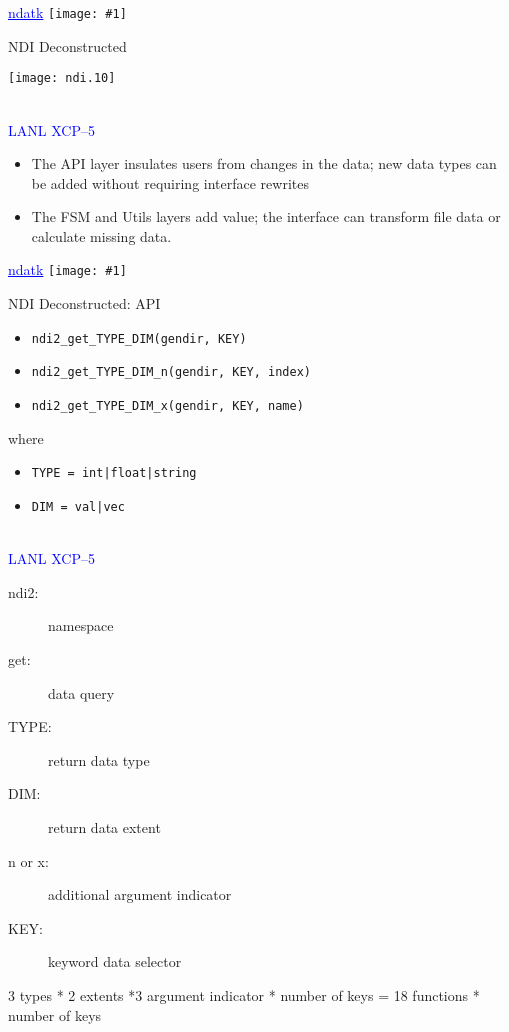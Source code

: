 \documentclass[clock]{slides}
\newenvironment{xslide}[1][logo.jpg]{\begin{slide} \tiny
\textcolor{blue}{\underline{ndatk}} \hfill
\texttt{[image: \#1]}
\normalsize}{\vfill\tiny
\textcolor{blue}{\hrulefill \\LANL XCP--5}
\end{slide}}
\begin{document}
\begin{xslide}
\begin{center}\Large
NDI Deconstructed
\end{center}

\begin{center}
\texttt{[image: ndi.10]}
\end{center}

\end{xslide}

\begin{note}\small

\begin{itemize}
\item The API layer insulates users from changes in the data; new data
  types can be added without requiring interface rewrites
\item The FSM and Utils layers add value; the interface can transform
  file data or calculate missing data.
\end{itemize}

\end{note}

\begin{xslide}
\begin{center}\Large
NDI Deconstructed: API
\end{center}

\begin{itemize}
\item \verb+ndi2_get_TYPE_DIM(gendir, KEY)+
\item \verb+ndi2_get_TYPE_DIM_n(gendir, KEY, index)+
\item \verb+ndi2_get_TYPE_DIM_x(gendir, KEY, name)+
\end{itemize}
where
\begin{itemize}
\item \verb+TYPE = int|float|string+
\item \verb+DIM = val|vec+
\end{itemize}
\end{xslide}

\begin{note}\small
\begin{description}
\item[ndi2: ] namespace
\item[get: ] data query
\item[TYPE: ] return data type  
\item[DIM: ] return data extent
\item[n or x: ] additional argument indicator
\item[KEY: ] keyword data selector
\end{description}

3 types * 2 extents *3 argument indicator * number of keys =
18 functions * number of keys
\end{note}
 
\end{document}
